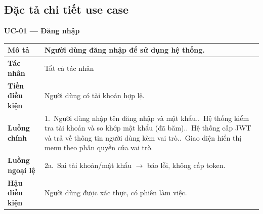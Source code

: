 \documentclass[12pt,a4paper]{report}
\newcommand{\ucfield}[1]{\textbf{#1}}
\begin{document}
\subsection{Đặc tả chi tiết use case}

\textbf{UC-01 --- Đăng nhập}
\begin{table}[H]\centering\small
\begin{tabularx}{\textwidth}{|L{3cm}|X|}
\hline
\ucfield{Mô tả} & Người dùng đăng nhập để sử dụng hệ thống. \\ \hline
\ucfield{Tác nhân} & Tất cả tác nhân \\ \hline
\ucfield{Tiền điều kiện} & Người dùng có tài khoản hợp lệ. \\ \hline
\ucfield{Luồng chính} &
1.~Người dùng nhập tên đăng nhập và mật khẩu..~Hệ thống kiểm tra tài khoản và so khớp mật khẩu (đã băm)..~Hệ thống cấp JWT và trả về thông tin người dùng kèm vai trò..~Giao diện hiển thị menu theo phân quyền của vai trò. \\ \hline
\ucfield{Luồng ngoại lệ} & 2a.~Sai tài khoản/mật khẩu $\rightarrow$ báo lỗi, không cấp token. \\ \hline
\ucfield{Hậu điều kiện} & Người dùng được xác thực, có phiên làm việc. \\ \hline
\end{tabularx}
\end{table}
\end{document}
